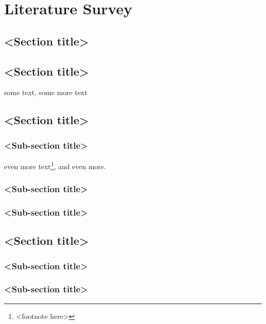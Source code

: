 \chapter{Literature Survey}

\section{<Section title>}


\section{<Section title>}
some text\cite{citation-1-name-here}, some more text

\section{<Section title>}

\subsection{<Sub-section title>}
even more text\footnote{<footnote here>}, and even more.

\subsection{<Sub-section title>}

\subsection{<Sub-section title>}


\section{<Section title>}

\subsection{<Sub-section title>}

\subsection{<Sub-section title>}

